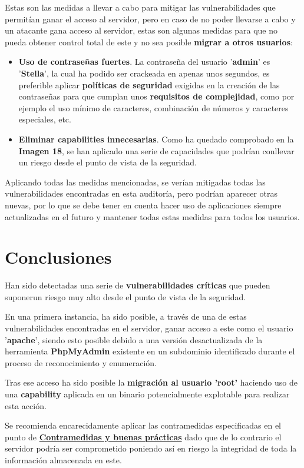 \documentclass[a4paper]{article} %
\begin{document}
  Estas son las medidas a llevar a cabo para mitigar las vulnerabilidades que permitían ganar el acceso al servidor, pero en caso de no poder llevarse a cabo y un atacante gana acceso al servidor, estas son algunas medidas para que no pueda obtener control total de este y no sea posible \textbf{migrar a otros usuarios}:

  \begin{itemize}
    \item \textbf{Uso de contraseñas fuertes}. La contraseña del usuario '\textbf{admin}' es '\textbf{Stella}', la cual ha podido ser crackeada en apenas unos segundos, es preferible aplicar \textbf{políticas de seguridad} exigidas en la creación de las contraseñas para que cumplan unos \textbf{requisitos de complejidad}, como por ejemplo el uso mínimo de caracteres, combinación de números y caracteres especiales, etc.
    \item \textbf{Eliminar capabilities innecesarias}. Como ha quedado comprobado en la \textbf{Imagen 18}, se han aplicado una serie de capacidades que podrían conllevar un riesgo desde el punto de vista de la seguridad.
  \end{itemize}

  Aplicando todas las medidas mencionadas, se verían mitigadas todas las vulnerabilidades encontradas en esta auditoría, pero podrían aparecer otras nuevas, por lo que se debe tener en cuenta hacer uso de aplicaciones siempre actualizadas en el futuro y mantener todas estas medidas para todos los usuarios.

  \section{Conclusiones}

  Han sido detectadas una serie de \textbf{vulnerabilidades críticas} que pueden suponerun riesgo muy alto desde el punto de vista de la seguridad.

  En una primera instancia, ha sido posible, a través de una de estas vulnerabilidades encontradas en el servidor, ganar acceso a este como el usuario '\textbf{apache}', siendo esto posible debido a una versión desactualizada de la herramienta \textbf{PhpMyAdmin} existente en un subdominio identificado durante el proceso de reconocimiento y enumeración.

  Tras ese acceso ha sido posible la \textbf{migración al usuario 'root'} haciendo uso de una \textbf{capability} aplicada en un binario potencialmente explotable para realizar esta acción.

  Se recomienda encarecidamente aplicar las contramedidas especificadas en el punto de \textbf{\hyperref[sec:contramedidas]{Contramedidas y buenas prácticas}} dado que de lo contrario el servidor podría ser comprometido poniendo así en riesgo la integridad de toda la información almacenada en este.
\end{document}
